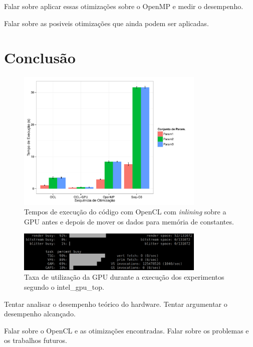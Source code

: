 \documentclass[12pt]{article}
\begin{document}
Falar sobre aplicar essas otimizações sobre o OpenMP e medir o desempenho.

Falar sobre as posiveis otimizações que ainda podem ser aplicadas.

\section{Conclusão}

\begin{figure}[H]
\centering
\includegraphics[width=0.8\textwidth]{final.pdf}
\caption{Tempos de execução do código com OpenCL com \textit{inlining} sobre a GPU antes e depois de mover os dados para memória de constantes.}
\label{fgclpressure}
\end{figure}

\begin{figure}[H]
\centering
\includegraphics[width=0.8\textwidth]{ss.png}
\caption{Taxa de utilização da GPU durante a execução dos experimentos segundo o intel\_gpu\_top.}
\label{fss}
\end{figure}

Tentar analisar o desempenho teórico do hardware. Tentar argumentar o desempenho alcançado.

Falar sobre o OpenCL e as otimizações encontradas. Falar sobre os problemas e os trabalhos futuros.
\end{document}
